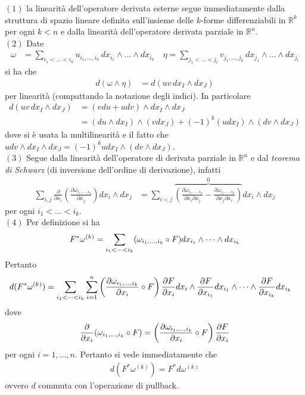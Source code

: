 \documentclass[twoside, 11pt]{amsbook}
\makeatletter
\newcommand{\0}{{(0)}}
\newcommand{\3}{{(3)}}
\theoremstyle{colonplain}
\theoremstyle{colondefinition}
\theoremstyle{colonremark}
\numberwithin{equation}{chapter}
\renewcommand{\proofname}{Dimostrazione}
\renewenvironment{proof}[1][\proofname]{\par
  \pushQED{\qed}%
  \normalfont \topsep6\p@\@plus6\p@\relax
  \trivlist
  \item[\hskip\labelsep\bfseries #1:]\ignorespaces
}{%
  \popQED\endtrivlist\@endpefalse
}
\makeatother
\begin{document}
\begin{proof} $(1)$ la linearità dell'operatore derivata esterne segue immediatamente dalla struttura di spazio lineare definita sull'insieme delle $k$-forme differenziabili in $\mathbb{R}^k$ per ogni $k < n$ e dalla linearità dell'operatore derivata parziale in $\mathbb{R}^n$. \\
$(2)$ Date
\begin{align}
    \omega &= \sum_{i_1 < \dots < i_k} u_{i_1, \dots, i_k} \, dx_{i_1} \wedge \dots \wedge dx_{i_k} \quad \eta = \sum_{j_1 < \dots < j_l} v_{j_1, \dots, j_k} \, dx_{j_1} \wedge \dots \wedge dx_{j_l}
\end{align}
si ha che
\begin{align}
    d(\omega \wedge \eta) &= d(uv \, dx_I \wedge dx_J)
\end{align}
per linearità (compattando la notazione degli indici). In particolare
\begin{align}
    d(uv \, dx_I \wedge dx_J) &= (vdu + udv) \wedge dx_I \wedge dx_J \\
    &= (du \wedge dx_I) \wedge (vdx_J) + (-1)^k(udx_I) \wedge (dv \wedge dx_J)
\end{align}
dove si è usata la multilinearità e il fatto che $udv \wedge dx_I \wedge dx_J = (-1)^k udx_I \wedge (dv \wedge dx_J)$. \\
$(3)$ Segue dalla linearità dell'operatore di derivata parziale in $\mathbb{R}^n$ e dal \textit{teorema di Schwarz} (di inversione dell'ordine di derivazione), infatti
\begin{align}
    \sum_{i, j}\frac{\partial}{\partial x_i}\left(\frac{\partial \omega_{i_1, \dots, i_k}}{\partial x_j}\right)dx_i \wedge dx_j &= \sum_{i < j}\overbrace{\left(\frac{\partial \omega_{i_1, \dots, i_k}}{\partial x_i\partial x_j} - \frac{\partial \omega_{i_1, \dots, i_k}}{\partial x_j \partial x_i}\right)}^{0}dx_i \wedge dx_j
\end{align}
per ogni $i_1 < \dots < i_k$. \\
$(4)$ Per definizione si ha
\begin{align}
    F^*\omega^{(k)} = \sum_{i_1 < \dots < i_k} (\omega_{i_1, \dots, i_k} \circ F) dx_{i_1} \wedge \dots \wedge dx_{i_k} \notag
\end{align}
Pertanto
\begin{align}
    d(F^*\omega^{(k)}) &= \sum_{i_1 < \dots < i_k}\sum_{i = 1}^n \left(\frac{\partial \omega_{i_1, \dots, i_k}}{\partial x_i} \circ F\right)\frac{\partial F}{\partial x_i} dx_i \wedge \frac{\partial F}{\partial x_{i_1}}dx_{i_1} \wedge \dots \wedge \frac{\partial F}{\partial x_{i_k}}dx_{i_k} \notag
\end{align}
dove
\begin{align}
    \frac{\partial}{\partial x_i}(\omega_{i_1, \dots, i_k} \circ F) = \left(\frac{\partial \omega_{i_1, \dots, i_k}}{\partial x_i} \circ F\right)\frac{\partial F}{\partial x_i} \notag
\end{align}
per ogni $i = 1, \dots, n$. Pertanto si vede immediatamente che
\begin{align}
    d(F^*\omega^{(k)}) = F^*d\omega^{(k)}
\end{align}
ovvero $d$ commuta con l'operazione di pullback.
\end{proof}
\end{document}
